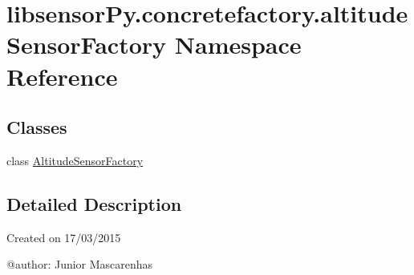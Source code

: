\hypertarget{namespacelibsensorPy_1_1concretefactory_1_1altitudeSensorFactory}{}\section{libsensor\+Py.\+concretefactory.\+altitude\+Sensor\+Factory Namespace Reference}
\label{namespacelibsensorPy_1_1concretefactory_1_1altitudeSensorFactory}
\subsection*{Classes}
\begin{DoxyCompactItemize}
\item 
class \hyperlink{classlibsensorPy_1_1concretefactory_1_1altitudeSensorFactory_1_1AltitudeSensorFactory}{Altitude\+Sensor\+Factory}
\end{DoxyCompactItemize}


\subsection{Detailed Description}
\begin{DoxyVerb}Created on 17/03/2015

@author: Junior Mascarenhas
\end{DoxyVerb}
 